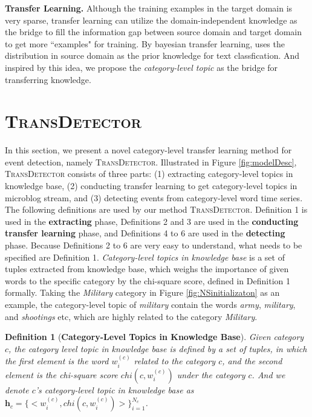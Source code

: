 \documentclass[runningheads,a4paper]{llncs}
\theoremstyle{exampstyle}
\newtheorem{rmkWithoutSpacing}[thm]{Definition}
\begin{document}
\textbf{Transfer Learning.} 
Although the training examples in the target domain is very sparse, transfer learning\cite{Pan2010A} can utilize the domain-independent knowledge as the bridge to fill the information gap between source domain and target domain\cite{Xiang2010Bridging} to get more ``examples" for training.
By bayesian transfer learning, \cite{dai2007transferring} uses the distribution in source domain as the prior knowledge for text classfication.
And inspired by this idea, we propose the \textit{category-level topic} as the bridge for transferring knowledge. 

\section{\textsc{TransDetector}} 
\label{sec:TransDetector}
In this section, we present a novel category-level transfer learning method for event detection, namely \textsc{TransDetector}. 
Illustrated in Figure \ref{fig:modelDesc}, \textsc{TransDetector} consists of three parts: (1) extracting category-level topics in knowledge base, (2) conducting transfer learning to get category-level topics in microblog stream, and (3) detecting events from category-level word time series.
The following definitions are used by our method \textsc{TransDetector}. 
Definition 1 is used in the \textbf{extracting} phase, Definitions 2 and 3 are used in the \textbf{conducting transfer learning} phase, and Definitions 4 to 6 are used in the \textbf{detecting} phase.
Because Definitions 2 to 6 are very easy to understand, what needs to be specified are Definition 1.
\textit{Category-level topics in knowledge base} is a set of tuples extracted from knowledge base, which weighs the importance of given words to the specific category by the chi-square score, defined in Definition 1 formally. 
Taking the \textit{Military} category in Figure \ref{fig:NSinitializaton} as an example, the category-level topic of \textit{military} contain the words \textit{army}, \textit{military}, and \textit{shootings} etc, which are highly related to the category \textit{Military}.

\begin{rmkWithoutSpacing}[\textbf{Category-Level Topics in Knowledge Base}] 
Given category \(c\), the category level topic in knowledge base is defined by a set of tuples, in which the first element is the word \(w^{(c)}_i\) related to the category \(c\), and the second element is the chi-square score \(chi(c,w^{(c)}_{i})\) under the category \(c\). 
And we denote \(c\)'s category-level topic in knowledge base as \(\bm{h}_c=\{<w^{(c)}_i,chi(c,w^{(c)}_{i})>\}_{i=1}^{N_c}\).
\end{rmkWithoutSpacing}
\end{document}
